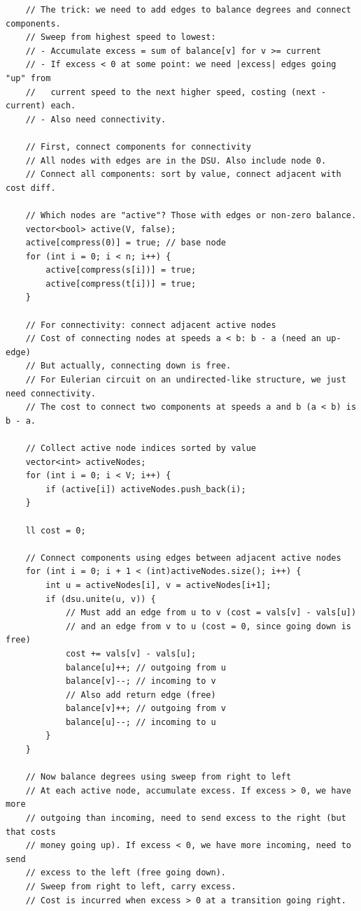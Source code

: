 \documentclass[11pt,a4paper]{article}
\begin{document}
\begin{lstlisting}
    // The trick: we need to add edges to balance degrees and connect components.
    // Sweep from highest speed to lowest:
    // - Accumulate excess = sum of balance[v] for v >= current
    // - If excess < 0 at some point: we need |excess| edges going "up" from
    //   current speed to the next higher speed, costing (next - current) each.
    // - Also need connectivity.

    // First, connect components for connectivity
    // All nodes with edges are in the DSU. Also include node 0.
    // Connect all components: sort by value, connect adjacent with cost diff.

    // Which nodes are "active"? Those with edges or non-zero balance.
    vector<bool> active(V, false);
    active[compress(0)] = true; // base node
    for (int i = 0; i < n; i++) {
        active[compress(s[i])] = true;
        active[compress(t[i])] = true;
    }

    // For connectivity: connect adjacent active nodes
    // Cost of connecting nodes at speeds a < b: b - a (need an up-edge)
    // But actually, connecting down is free.
    // For Eulerian circuit on an undirected-like structure, we just need connectivity.
    // The cost to connect two components at speeds a and b (a < b) is b - a.

    // Collect active node indices sorted by value
    vector<int> activeNodes;
    for (int i = 0; i < V; i++) {
        if (active[i]) activeNodes.push_back(i);
    }

    ll cost = 0;

    // Connect components using edges between adjacent active nodes
    for (int i = 0; i + 1 < (int)activeNodes.size(); i++) {
        int u = activeNodes[i], v = activeNodes[i+1];
        if (dsu.unite(u, v)) {
            // Must add an edge from u to v (cost = vals[v] - vals[u])
            // and an edge from v to u (cost = 0, since going down is free)
            cost += vals[v] - vals[u];
            balance[u]++; // outgoing from u
            balance[v]--; // incoming to v
            // Also add return edge (free)
            balance[v]++; // outgoing from v
            balance[u]--; // incoming to u
        }
    }

    // Now balance degrees using sweep from right to left
    // At each active node, accumulate excess. If excess > 0, we have more
    // outgoing than incoming, need to send excess to the right (but that costs
    // money going up). If excess < 0, we have more incoming, need to send
    // excess to the left (free going down).
    // Sweep from right to left, carry excess.
    // Cost is incurred when excess > 0 at a transition going right.


\end{lstlisting}
\end{document}
